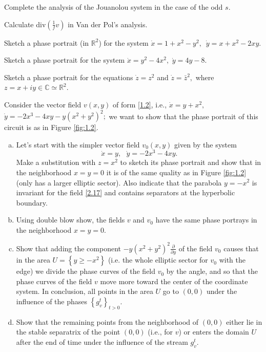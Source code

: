 \begin{task}
	Complete the analysis of the Jouanolou system in the case of the odd $s$.
\end{task}

\begin{task}
	Calculate \textrm{div}$\left( \frac{1}{f}v\right) $ in Van der Pol's analysis.
\end{task}

\begin{task}
	Sketch a phase portrait (in $\mathbb{R}^{2}$) for the system $\dot{x}=1+x^{2}-y^{2},$\ $\dot{y}=x+x^{2}-2xy.$
\end{task}

\begin{task}
	Sketch a phase portrait for the system $\dot{x}%
	=y^{2}-4x^{2},$ $\dot{y}=4y-8.$
\end{task}

\begin{task}
	Sketch a phase portrait for the equations $\dot{z}=z^{2}$ and $\dot{z}=\bar{z}^{2},$ where $z=x+iy\in \mathbb{C}\simeq
	\mathbb{R}^{2}.$
\end{task}

\begin{task}
	Consider the vector field $v (x, y)$ of form \eqref{1.2}, i.e., $\dot{x}=y+x^{2},$ $\dot{y}=-2x^{3}-4xy-y(x^{2}+y^{2})^{2};$ we want to show that the phase portrait of this circuit is as in Figure \ref{fig:1.2}.
	\begin{enumerate}[(a)]
		\item Let's start with the simpler vector field $v_{0}(x,y)$ given by the system\begin{equation}
		\label{2.17}
		\dot{x}=y,\ \ \ \dot{y}=-2x^{3}-4xy.
		\end{equation}
		Make a substitution with $z=x^{2}$ to sketch its phase portrait and show that in the neighborhood $x=y=0$ it is of the same quality as in Figure \ref{fig:1.2} (only has a larger elliptic sector). Also indicate that the parabola $y=-x^{2}$ is invariant for the field \eqref{2.17} and contains separators at the hyperbolic boundary.
		\item Using double blow show, the fields $v$ and $v_0$ have the same phase portrays in the neighborhood $x = y = 0$.
		\item Show that adding the component $-y\left(
		x^{2}+y^{2}\right) ^{2}\frac{\partial }{\partial y}$ of the field $v_{0}$ causes that in the area $U=\left\{ y\geq -x^{2}\right\} $ (i.e. the whole elliptic sector for $v_{0}$ with the edge) we divide the phase curves of the field $v_{0}$ by the angle, and so that the phase curves of the field $v$ move more toward the center of the coordinate system. In conclusion, all points in the area $U$ go to $(0, 0)$ under the influence of the phases $\left\{ g_{v}^{t}\right\}_{t>0}$.
		\item Show that the remaining points from the neighborhood of $(0, 0)$ either lie in the stable separatrix of the point $(0, 0)$ (i.e., for $v$) or enters the domain $U$ after the end of time under the influence of the stream $g_{v}^{t}.$
	\end{enumerate}
\end{task}